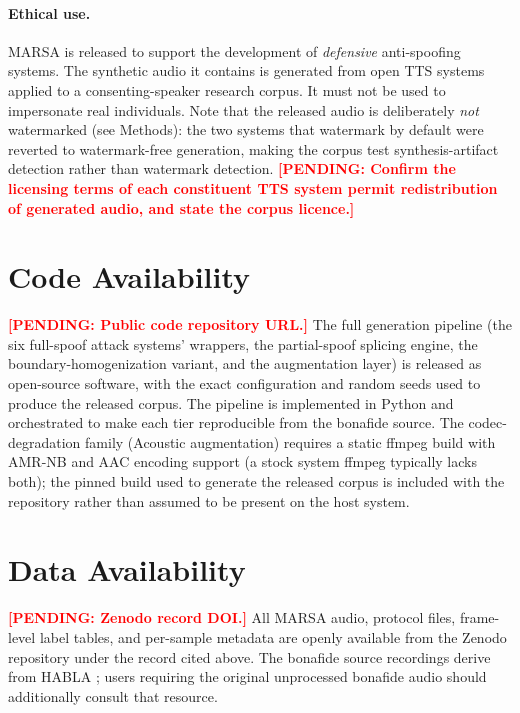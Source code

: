 \documentclass[11pt]{article}
\newcommand{\PENDING}[1]{\textcolor{red}{\textbf{[PENDING: #1]}}}
\begin{document}
\paragraph{Ethical use.} MARSA is released to support the development of
\emph{defensive} anti-spoofing systems. The synthetic audio it contains
is generated from open TTS systems applied to a consenting-speaker
research corpus. It must not be used to impersonate real individuals.
Note that the released audio is deliberately \emph{not} watermarked (see
Methods): the two systems that watermark by default were reverted to
watermark-free generation, making the corpus test synthesis-artifact
detection rather than watermark detection. \PENDING{Confirm the licensing
terms of each constituent TTS system permit redistribution of generated
audio, and state the corpus licence.}

\section*{Code Availability}

\PENDING{Public code repository URL.} The full generation pipeline (the
six full-spoof attack systems' wrappers, the partial-spoof splicing
engine, the boundary-homogenization variant, and the augmentation
layer) is released as open-source software, with the exact configuration
and random seeds used to produce the released corpus. The pipeline is
implemented in Python and orchestrated to make each tier reproducible
from the bonafide source. The codec-degradation family (Acoustic
augmentation) requires a static ffmpeg build with AMR-NB and AAC
encoding support (a stock system ffmpeg typically lacks both); the
pinned build used to generate the released corpus is included with the
repository rather than assumed to be present on the host system.

\section*{Data Availability}

\PENDING{Zenodo record DOI.} All MARSA audio, protocol files, frame-level
label tables, and per-sample metadata are openly available from the
Zenodo repository under the record cited above. The bonafide source
recordings derive from HABLA \citep{habla}; users requiring the original
unprocessed bonafide audio should additionally consult that resource.

\end{document}
